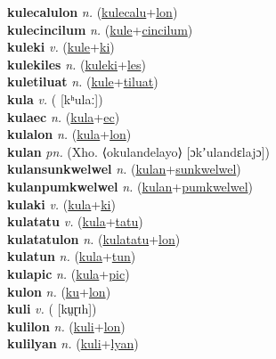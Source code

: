 \textbf{kulecalulon} \textit{n.} (\hyperref[kulecalu]{kulecalu}+\hyperref[lon]{lon})
 \label{kulecalulon} \\
\textbf{kulecincilum} \textit{n.} (\hyperref[kule]{kule}+\hyperref[cincilum]{cincilum})
 \label{kulecincilum} \\
\textbf{kuleki} \textit{v.} (\hyperref[kule]{kule}+\hyperref[ki]{ki})
 \label{kuleki} \\
\textbf{kulekiles} \textit{n.} (\hyperref[kuleki]{kuleki}+\hyperref[les]{les})
 \label{kulekiles} \\
\textbf{kuletiluat} \textit{n.} (\hyperref[kule]{kule}+\hyperref[tiluat]{tiluat})
 \label{kuletiluat} \\
\textbf{kula} \textit{v.} ( [kʰulaː])
 \label{kula} \\
\textbf{kulaec} \textit{n.} (\hyperref[kula]{kula}+\hyperref[ec]{ec})
 \label{kulaec} \\
\textbf{kulalon} \textit{n.} (\hyperref[kula]{kula}+\hyperref[lon]{lon})
 \label{kulalon} \\
\textbf{kulan} \textit{pn.} (Xho. ⟨okulandelayo⟩ [ɔkʼulandɛlajɔ])
 \label{kulan} \\
\textbf{kulansunkwelwel} \textit{n.} (\hyperref[kulan]{kulan}+\hyperref[sunkwelwel]{sunkwelwel})
 \label{kulansunkwelwel} \\
\textbf{kulanpumkwelwel} \textit{n.} (\hyperref[kulan]{kulan}+\hyperref[pumkwelwel]{pumkwelwel})
 \label{kulanpumkwelwel} \\
\textbf{kulaki} \textit{v.} (\hyperref[kula]{kula}+\hyperref[ki]{ki})
 \label{kulaki} \\
\textbf{kulatatu} \textit{v.} (\hyperref[kula]{kula}+\hyperref[tatu]{tatu})
 \label{kulatatu} \\
\textbf{kulatatulon} \textit{n.} (\hyperref[kulatatu]{kulatatu}+\hyperref[lon]{lon})
 \label{kulatatulon} \\
\textbf{kulatun} \textit{n.} (\hyperref[kula]{kula}+\hyperref[tun]{tun})
 \label{kulatun} \\
\textbf{kulapic} \textit{n.} (\hyperref[kula]{kula}+\hyperref[pic]{pic})
 \label{kulapic} \\
\textbf{kulon} \textit{n.} (\hyperref[ku]{ku}+\hyperref[lon]{lon})
 \label{kulon} \\
\textbf{kuli} \textit{v.} ( [kṳɽɪh])
 \label{kuli} \\
\textbf{kulilon} \textit{n.} (\hyperref[kuli]{kuli}+\hyperref[lon]{lon})
 \label{kulilon} \\
\textbf{kulilyan} \textit{n.} (\hyperref[kuli]{kuli}+\hyperref[lyan]{lyan})
